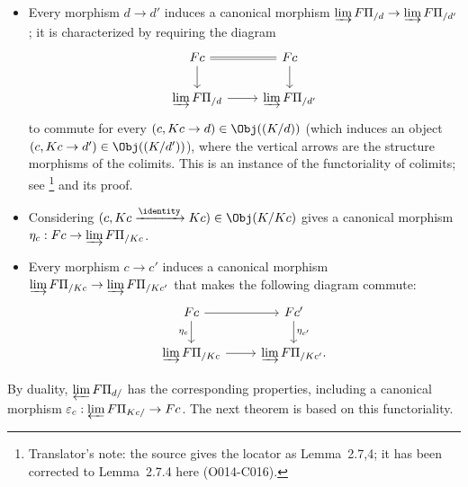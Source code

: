 \begin{itemize}
	\item Every morphism $d \to d'$ induces a canonical morphism
	$\varinjlim F\Pi_{/d} \to \varinjlim F\Pi_{/d'}$; it is characterized by
	requiring the diagram
	\begin{equation}\label{eqn:Kan-limit-aux-0}
	\begin{tikzcd}
		Fc \arrow[equal, r] \arrow[d] & Fc \arrow[d] \\
		\varinjlim F \Pi_{/d} \arrow[r] & \varinjlim F \Pi_{/d'}
	\end{tikzcd}\end{equation}
	to commute for every $(c,Kc \to d) \in \Obj((K/d))$ (which induces an
	object $(c,Kc \to d') \in \Obj((K/d'))$), where the vertical arrows are
	the structure morphisms of the colimits. This is an instance of the
	functoriality of colimits; see \cite[Lemma 2.7.4]{Li1}\footnote{Translator's
	note: the source gives the locator as Lemma~2.7,4; it has been corrected to
	Lemma~2.7.4 here (O014-C016).} and its proof.
	\item Considering
	$(c,Kc \xrightarrow{\identity} Kc) \in \Obj(K/Kc)$ gives a canonical
	morphism $\eta_c: Fc \to \varinjlim F\Pi_{/Kc}$.
	\item Every morphism $c \to c'$ induces a canonical morphism
	$\varinjlim F\Pi_{/Kc} \to \varinjlim F\Pi_{/Kc'}$ that makes the following
	diagram commute:
	\[\begin{tikzcd}
		Fc \arrow[r] \arrow[d, "{\eta_c}"'] & Fc' \arrow[d, "{\eta_{c'}}"] \\
		\varinjlim F \Pi_{/Kc} \arrow[r] & \varinjlim F \Pi_{/Kc'} .
	\end{tikzcd}\]
\end{itemize}

By duality, $\varprojlim F\Pi_{d/}$ has the corresponding properties,
including a canonical morphism
$\varepsilon_c: \varprojlim F\Pi_{Kc/} \to Fc$. The next theorem is based on
this functoriality.

